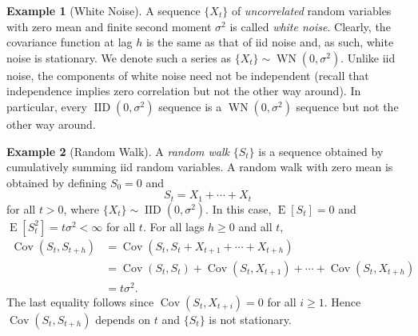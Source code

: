 \documentclass[11pt,a4]{article}
\DeclareMathOperator{\cov}{Cov}
\DeclareMathOperator{\E}{E}
\DeclareMathOperator{\IID}{IID}
\DeclareMathOperator{\WN}{WN}
\theoremstyle{definition}
\newtheorem{example}{Example}
\begin{document}
\begin{example}[White Noise]
A sequence $\{ X_t \}$ of \emph{uncorrelated} random variables with zero mean 
and finite second moment $\sigma^2$ is called \emph{white noise}. Clearly, the 
covariance function at lag $h$ is the same as that of iid noise and, as such, 
white noise is stationary. We denote such a series as
$\{ X_t \} \sim \WN (0, \sigma^2)$. Unlike iid noise, the 
components of white noise need not be independent (recall that independence 
implies zero correlation but not the other way around). In particular, every
$\IID (0, \sigma^2)$ sequence is a $\WN (0, \sigma^2)$ sequence 
but not the other way around. 
\end{example}

\begin{example}[Random Walk]
 A \emph{random walk} $\{ S_t \}$ is a sequence obtained by cumulatively summing 
iid random variables. A random walk with zero mean is obtained by defining 
$S_0 = 0$ and 
\[
    S_t = X_1 + \cdots + X_t
\]
for all $t > 0$, where $\{ X_t \} \sim \IID(0, \sigma^2)$. In this case, 
$\E [S_t] = 0$ and $\E [S_t^2] = t \sigma^2 < \infty$ for all $t$. For all lags 
$h \geq 0$ and all $t$,
\begin{align*}
    \cov (S_t, S_{t + h}) 
        & = \cov (S_t, S_t + X_{t + 1} + \cdots + X_{t + h}) \\
        & = \cov (S_t, S_t) + \cov (S_t, X_{t + 1}) + \cdots + \cov (S_t, X_{t + h}) \\
        & = t \sigma^2.  
\end{align*}
The last equality follows since $\cov (S_t, X_{t + i}) = 0$ for all $i \geq 1$.
Hence $\cov (S_t, S_{t + h})$ depends on $t$ and $\{ S_t \}$ is not stationary.
\end{example}
\end{document}
